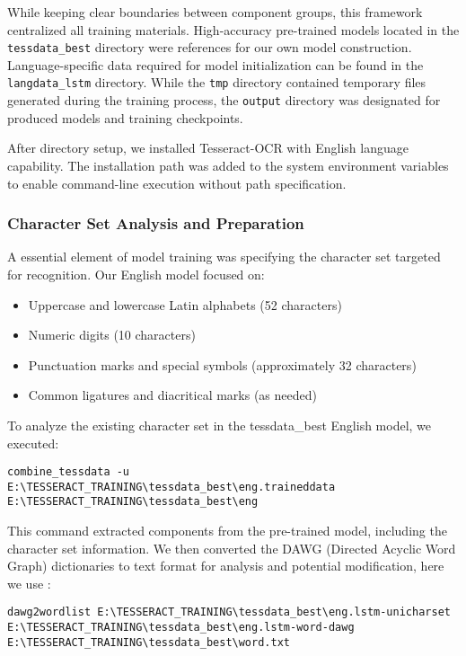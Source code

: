 \vspace{0.8cm}

While keeping clear boundaries between component groups, this framework centralized all training materials. High-accuracy pre-trained models located in the \texttt{tessdata\_best} directory were references for our own model construction. Language-specific data required for model initialization can be found in the \texttt{langdata\_lstm} directory. While the \texttt{tmp} directory contained temporary files generated during the training process, the \texttt{output} directory was designated for produced models and training checkpoints.

After directory setup, we installed Tesseract-OCR with English language capability. The installation path was added to the system environment variables to enable command-line execution without path specification.

\subsubsection{Character Set Analysis and Preparation}
A essential element of model training was specifying the character set targeted for recognition. Our English model focused on:


\begin{itemize}
    \item Uppercase and lowercase Latin alphabets (52 characters)
    \item Numeric digits (10 characters)
    \item Punctuation marks and special symbols (approximately 32 characters)
    \item Common ligatures and diacritical marks (as needed)
\end{itemize}

To analyze the existing character set in the tessdata\_best English model, we executed:

\begin{verbatim}
combine_tessdata -u 
E:\TESSERACT_TRAINING\tessdata_best\eng.traineddata 
E:\TESSERACT_TRAINING\tessdata_best\eng
\end{verbatim}

This command extracted components from the pre-trained model, including the character set information. We then converted the DAWG (Directed Acyclic Word Graph) dictionaries to text format for analysis and potential modification, here we use :

\begin{verbatim}
dawg2wordlist E:\TESSERACT_TRAINING\tessdata_best\eng.lstm-unicharset 
E:\TESSERACT_TRAINING\tessdata_best\eng.lstm-word-dawg 
E:\TESSERACT_TRAINING\tessdata_best\word.txt
\end{verbatim}

